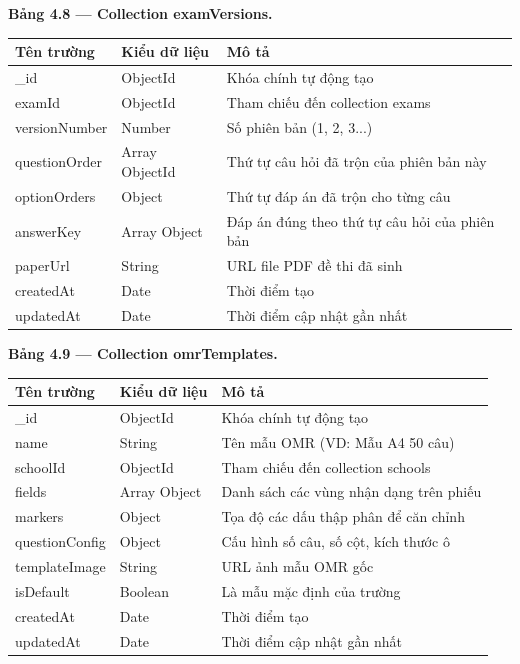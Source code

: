 ﻿\documentclass[../DoAn.tex]{subfiles}
\begin{document}
\noindent\textbf{Bảng 4.8 — Collection examVersions.}
\begin{center}
\begin{tabular}{|p{3.5cm}|p{2.5cm}|p{7cm}|}
\hline
\textbf{Tên trường} & \textbf{Kiểu dữ liệu} & \textbf{Mô tả} \\ \hline
\_id & ObjectId & Khóa chính tự động tạo \\ \hline
examId & ObjectId & Tham chiếu đến collection exams \\ \hline
versionNumber & Number & Số phiên bản (1, 2, 3...) \\ \hline
questionOrder & Array ObjectId & Thứ tự câu hỏi đã trộn của phiên bản này \\ \hline
optionOrders & Object & Thứ tự đáp án đã trộn cho từng câu \\ \hline
answerKey & Array Object & Đáp án đúng theo thứ tự câu hỏi của phiên bản \\ \hline
paperUrl & String & URL file PDF đề thi đã sinh \\ \hline
createdAt & Date & Thời điểm tạo \\ \hline
updatedAt & Date & Thời điểm cập nhật gần nhất \\ \hline
\end{tabular}
\end{center}

\vspace{0.3cm}

\noindent\textbf{Bảng 4.9 — Collection omrTemplates.}
\begin{center}
\begin{tabular}{|p{3.5cm}|p{2.5cm}|p{7cm}|}
\hline
\textbf{Tên trường} & \textbf{Kiểu dữ liệu} & \textbf{Mô tả} \\ \hline
\_id & ObjectId & Khóa chính tự động tạo \\ \hline
name & String & Tên mẫu OMR (VD: Mẫu A4 50 câu) \\ \hline
schoolId & ObjectId & Tham chiếu đến collection schools \\ \hline
fields & Array Object & Danh sách các vùng nhận dạng trên phiếu \\ \hline
markers & Object & Tọa độ các dấu thập phân để căn chỉnh \\ \hline
questionConfig & Object & Cấu hình số câu, số cột, kích thước ô \\ \hline
templateImage & String & URL ảnh mẫu OMR gốc \\ \hline
isDefault & Boolean & Là mẫu mặc định của trường \\ \hline
createdAt & Date & Thời điểm tạo \\ \hline
updatedAt & Date & Thời điểm cập nhật gần nhất \\ \hline
\end{tabular}
\end{center}
\end{document}
